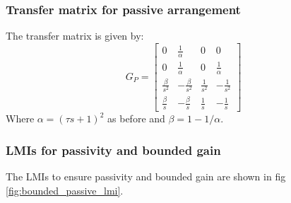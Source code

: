 \documentclass{article}
\begin{document}
\subsubsection{Transfer matrix for passive arrangement} 

The transfer matrix is given by:
\begin{equation}
    G_P = 
    \begin{bmatrix}
        0 & \frac{1}{\alpha} & 0 & 0 \\[6pt]
        0 & \frac{1}{\alpha} & 0 & \frac{1}{\alpha} \\[6pt]
        \frac{\beta}{s^2} & -\frac{\beta}{s^2} & \frac{1}{s^2} & -\frac{1}{s^2} \\[6pt]
        \frac{\beta}{s} & -\frac{\beta}{s} & \frac{1}{s} & -\frac{1}{s}
    \end{bmatrix}
\end{equation}
Where $\alpha = (\tau s + 1)^2$ as before and $\beta = 1 - 1/\alpha$.

\subsubsection{LMIs for passivity and bounded gain}

The LMIs to ensure passivity and bounded gain are shown in fig \ref{fig:bounded_passive_lmi}.
\end{document}
